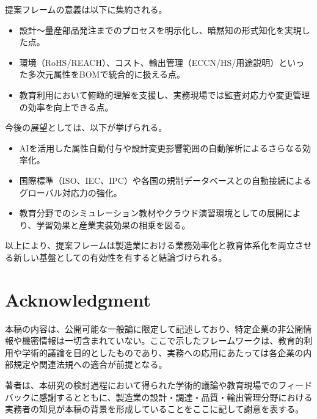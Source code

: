 \documentclass[10pt,conference]{IEEEtran}
\begin{document}
提案フレームの意義は以下に集約される。
\begin{itemize}
  \item 設計～量産部品発注までのプロセスを明示化し、暗黙知の形式知化を実現した点。
  \item 環境（RoHS/REACH）、コスト、輸出管理（ECCN/HS/用途説明）といった多次元属性をBOMで統合的に扱える点。
  \item 教育利用において俯瞰的理解を支援し、実務現場では監査対応力や変更管理の効率を向上できる点。
\end{itemize}

今後の展望としては、以下が挙げられる。
\begin{itemize}
  \item AIを活用した属性自動付与や設計変更影響範囲の自動解析によるさらなる効率化。
  \item 国際標準（ISO、IEC、IPC）や各国の規制データベースとの自動接続によるグローバル対応力の強化。
  \item 教育分野でのシミュレーション教材やクラウド演習環境としての展開により、学習効果と産業実装効果の相乗を図る。
\end{itemize}

以上により、提案フレームは製造業における業務効率化と教育体系化を両立させる新しい基盤としての有効性を有すると結論づけられる。

\section*{Acknowledgment}
本稿の内容は、公開可能な一般論に限定して記述しており、特定企業の非公開情報や機密情報は一切含まれていない。ここで示したフレームワークは、教育的利用や学術的議論を目的としたものであり、実務への応用にあたっては各企業の内部規定や関連法規への適合が前提となる。

著者は、本研究の検討過程において得られた学術的議論や教育現場でのフィードバックに感謝するとともに、製造業の設計・調達・品質・輸出管理分野における実務者の知見が本稿の背景を形成していることをここに記して謝意を表する。
\end{document}
